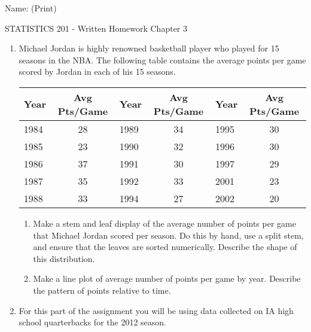 \documentclass{article}[11pt]
\begin{document}
\hspace{2in} Name: (Print) \underline{\mbox{\hspace{3.5in}}}\\

\begin{center}
{\Large STATISTICS 201 - Written Homework Chapter 3}\\[3mm]
\end{center}

\begin{enumerate}

\item Michael Jordan is highly renowned basketball player who played for 15 seasons in the NBA.  The following table contains the average points per game scored by Jordan in each of his 15 seasons.

\begin{center}
\begin{tabular}{|l|c||l|c||l|c|} \hline
Year & Avg Pts/Game & Year & Avg Pts/Game & Year & Avg Pts/Game 
\\ \hline
1984 & 28 & 1989 & 34 & 1995 & 30 \\
1985 & 23 & 1990 & 32 & 1996 & 30 \\
1986 & 37 & 1991 & 30 & 1997 & 29 \\
1987 & 35 & 1992 & 33 & 2001 & 23 \\
1988 & 33 & 1994 & 27 & 2002 & 20 \\ \hline
\end{tabular}
\end{center}

\begin{enumerate}
\item Make a stem and leaf display of the average number of points per game that Michael Jordan scored per season.  Do this by hand, use a split stem, and ensure that the leaves are sorted numerically. Describe the shape of this distribution. \\[2.5in]

\item Make a line plot of average number of points per game by year. Describe the pattern of points relative to time. \\[2.5in]

\end{enumerate}

\newpage
\item For this part of the assignment you will be using data collected on IA high school quarterbacks for the 2012 season.  


\end{enumerate}
\end{document}
